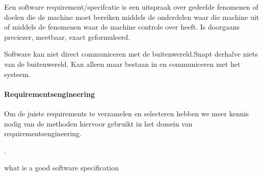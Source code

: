 \documentclass{article}
\begin{document}
	Een software requirement/specifcatie is een uitspraak over gedeelde fenomenen of doelen die de machine
	moet bereiken middels de onderdelen waar die machine uit of middels de fenomenen waar de machine controle
	over heeft. Is doorgaans preciezer, meetbaar, exact geformuleerd.
	
	Software kan niet direct communiceren met de buitenwereld.Snapt derhalve niets van de buitenwereld. Kan alleen maar bestaan in en communiceren met het systeem.
	
	
	\paragraph{Requirementsengineering}
	
	Om de juiste requirements te verzamelen en selecteren hebben we meer kennis nodig van de methoden hiervoor gebruikt in het domein van requirementsengineering.
	\cite{jonkerTreurKlush200informativeAgents}
	\cite{boehmBoseLeeRequirementsNegotiations}
	\cite{muHungJinLiu2013inconsistencyReqs}
	\cite{hunterNuseibeh1996manageSpecs}
	
	\cite{zavePamela4darkCorners}
	\cite{zavePAmela1997regEngineering}.
	
	
	what is a good software specification
	
\end{document}
